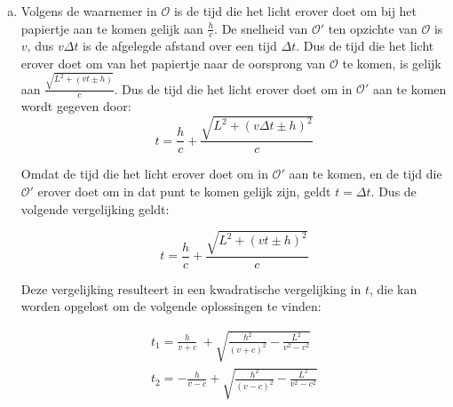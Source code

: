 \documentclass[12pt, a4paper]{article}
\begin{document}
\begin{enumerate}[(a).]
    \item \label{iteme}
    Volgens de waarnemer in $\mathcal{O}$ is de tijd die het licht erover doet om bij
    het papiertje aan te komen gelijk aan $\frac{h}{c}$. 
    De snelheid van $\mathcal{O}'$ ten opzichte van $\mathcal{O}$ is $v$,
    dus $v \Delta t$ is de afgelegde afstand over een tijd $\Delta t$.
    Dus de tijd die het licht erover doet om van het papiertje naar de oorsprong van
    $\mathcal{O}$ te komen, is gelijk aan $\frac{\sqrt{L^2 + (vt \pm h)}}{c}$.
    Dus de tijd die het licht erover doet om in $\mathcal{O}'$ aan te komen 
    wordt gegeven door:
    \begin{equation}
        t = \frac{h}{c} + \frac{\sqrt{L^2 + \left(v \Delta t \pm h\right)^2}}{c}
    \end{equation}
    
    \newpage
    Omdat de tijd die het licht erover doet om in $\mathcal{O}'$ aan te komen,
    en de tijd die $\mathcal{O}'$ erover doet om in dat punt te komen gelijk zijn,
    geldt $t = \Delta t$. Dus de volgende vergelijking geldt:

    \begin{equation}
        t = \frac{h}{c} + \frac{\sqrt{L^2 + \left(vt \pm h\right)^2}}{c}
    \end{equation}

    Deze vergelijking resulteert in een kwadratische vergelijking in $t$, 
    die kan worden opgelost om de volgende oplossingen te vinden:

    \begin{equation}
        \begin{split}
            t_1 = \frac{h}{v+c}\ +\sqrt{\frac{h^{2}}{\left(v+c\right)^{2}}-\frac{L^{2}}{v^{2}-c^{2}}}\\
            t_2 = -\frac{h}{v-c}+\sqrt{\frac{h^{2}}{\left(v-c\right)^{2}}-\frac{L^{2}}{v^{2}-c^{2}}}  
        \end{split}
    \end{equation}
    

\end{enumerate}
\end{document}
